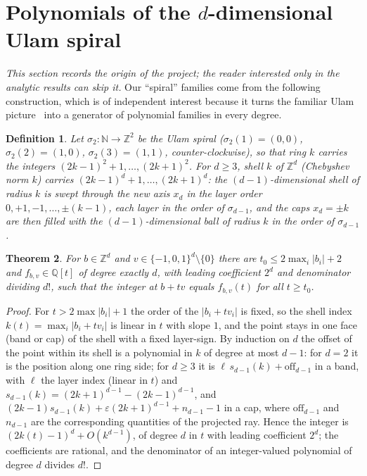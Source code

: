 \documentclass[11pt,a4paper]{article}
\newtheorem{theorem}{Theorem}
\newtheorem{definition}[theorem]{Definition}
\theoremstyle{remark}\newtheorem{remark}[theorem]{Remark}
\newcommand{\Z}{\mathbb{Z}}
\newcommand{\N}{\mathbb{N}}
\newcommand{\Q}{\mathbb{Q}}
\begin{document}
\FloatBarrier
\section{Polynomials of the $d$-dimensional Ulam spiral}\label{sec:spiral}

\emph{This section records the origin of the project; the reader interested only in the analytic results
can skip it.} Our ``spiral'' families come from the following construction, which is of independent interest because it
turns the familiar Ulam picture~\cite{Stein1964} into a generator of polynomial families in every degree.

\begin{definition}\label{def:spiral}
Let $\sigma_2:\N\to\Z^2$ be the Ulam spiral ($\sigma_2(1)=(0,0)$, $\sigma_2(2)=(1,0)$,
$\sigma_2(3)=(1,1)$, counter-clockwise), so that ring $k$ carries the integers $(2k-1)^2+1,\dots,(2k+1)^2$.
For $d\ge3$, shell $k$ of $\Z^d$ (Chebyshev norm $k$) carries $(2k-1)^d+1,\dots,(2k+1)^d$: the
$(d-1)$-dimensional shell of radius $k$ is swept through the new axis $x_d$ in the layer order
$0,+1,-1,\dots,\pm(k-1)$, each layer in the order of $\sigma_{d-1}$, and the caps $x_d=\pm k$ are then
filled with the $(d-1)$-dimensional ball of radius $k$ in the order of $\sigma_{d-1}$.
\end{definition}

\begin{theorem}\label{thm:poly}
For $b\in\Z^d$ and $v\in\{-1,0,1\}^d\setminus\{0\}$ there are $t_0\le2\max_i|b_i|+2$ and
$f_{b,v}\in\Q[t]$ of degree exactly $d$, with leading coefficient $2^d$ and denominator dividing $d!$,
such that the integer at $b+tv$ equals $f_{b,v}(t)$ for all $t\ge t_0$.
\end{theorem}

\begin{proof}
For $t>2\max|b_i|+1$ the order of the $|b_i+tv_i|$ is fixed, so the shell index
$k(t)=\max_i|b_i+tv_i|$ is linear in $t$ with slope $1$, and the point stays in one face (band or cap)
of the shell with a fixed layer-sign. By induction on $d$ the offset of the point within its shell is a
polynomial in $k$ of degree at most $d-1$: for $d=2$ it is the position along one ring side; for
$d\ge3$ it is $\ell\,s_{d-1}(k)+\mathrm{off}_{d-1}$ in a band, with $\ell$ the layer index (linear in
$t$) and $s_{d-1}(k)=(2k+1)^{d-1}-(2k-1)^{d-1}$, and $(2k-1)s_{d-1}(k)+\varepsilon(2k+1)^{d-1}+n_{d-1}-1$
in a cap, where $\mathrm{off}_{d-1}$ and $n_{d-1}$ are the corresponding quantities of the projected ray.
Hence the integer is $(2k(t)-1)^d+O(k^{d-1})$, of degree $d$ in $t$ with leading coefficient $2^d$; the
coefficients are rational, and the denominator of an integer-valued polynomial of degree $d$ divides
$d!$.
\end{proof}
\end{document}
